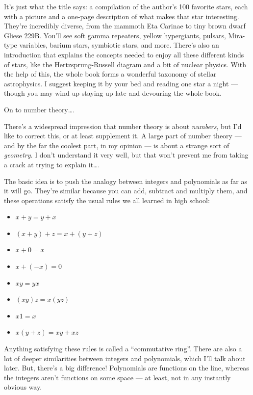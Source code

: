 \documentclass{article}
\def\tightlist{}
\begin{document}
It's just what the title says: a compilation of the author's 100
favorite stars, each with a picture and a one-page description of what
makes that star interesting. They're incredibly diverse, from the
mammoth Eta Carinae to tiny brown dwarf Gliese 229B. You'll see soft
gamma repeaters, yellow hypergiants, pulsars, Mira-type variables,
barium stars, symbiotic stars, and more. There's also an introduction
that explains the concepts needed to enjoy all these different kinds of
stars, like the Hertzsprung-Russell diagram and a bit of nuclear
physics. With the help of this, the whole book forms a wonderful
taxonomy of stellar astrophysics. I suggest keeping it by your bed and
reading one star a night --- though you may wind up staying up late and
devouring the whole book.

On to number theory\ldots.

There's a widespread impression that number theory is about
\emph{numbers}, but I'd like to correct this, or at least supplement it.
A large part of number theory --- and by the far the coolest part, in my
opinion --- is about a strange sort of \emph{geometry}. I don't
understand it very well, but that won't prevent me from taking a crack
at trying to explain it\ldots.

The basic idea is to push the analogy between integers and polynomials
as far as it will go. They're similar because you can add, subtract and
multiply them, and these operations satisfy the usual rules we all
learned in high school:

\begin{itemize}
\tightlist
\item
  \(x + y = y + x\)
\item
  \((x + y) + z = x + (y + z)\)
\item
  \(x + 0 = x\)
\item
  \(x + (-x) = 0\)
\item
  \(xy = yx\)
\item
  \((xy)z = x(yz)\)
\item
  \(x1 = x\)
\item
  \(x(y + z) = xy + xz\)
\end{itemize}

Anything satisfying these rules is called a ``commutative ring''. There
are also a lot of deeper similarities between integers and polynomials,
which I'll talk about later. But, there's a big difference! Polynomials
are functions on the line, whereas the integers aren't functions on some
space --- at least, not in any instantly obvious way.
\end{document}
